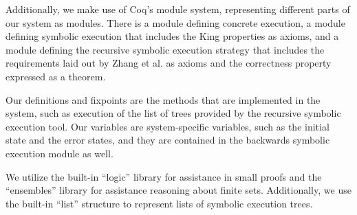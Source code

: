 
 

Additionally, we make use of Coq's module system, representing different parts of our system as modules.  There is a module defining concrete execution, a module defining symbolic execution that includes the King properties as axioms, and a module defining the recursive symbolic execution strategy that includes the requirements laid out by Zhang et al. as axioms and the correctness property expressed as a theorem.

Our definitions and fixpoints are the methods that are implemented
in the system, such as execution of the list of trees provided by the recursive
symbolic execution tool. Our variables are system-specific variables, such as the
initial state and the error states, and they are contained in the backwards symbolic execution module as well.

We utilize the built-in ``logic'' library for assistance in small proofs and the ``ensembles'' library for assistance reasoning about finite sets. Additionally, we use the built-in ``list'' structure to represent lists of symbolic execution trees.









